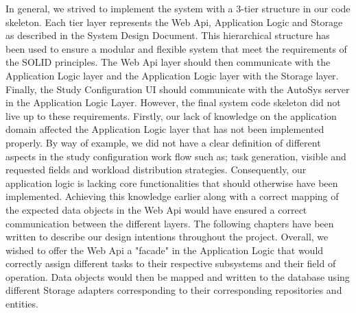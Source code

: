 In general, we strived to implement the system with a 3-tier structure in our code skeleton. Each tier layer represents the Web Api, Application Logic and Storage as described in the System Design Document. This hierarchical structure has been used to ensure a modular and flexible system that meet the requirements of the SOLID principles. The Web Api layer should then communicate with the Application Logic layer and the Application Logic layer with the Storage layer. Finally, the Study Configuration UI should communicate with the AutoSys server in the Application Logic Layer. However, the final system code skeleton did not live up to these requirements. Firstly, our lack of knowledge on the application domain affected the Application Logic layer that has not been implemented properly. By way of example, we did not have a clear definition of different aspects in the study configuration work flow such as; task generation, visible and requested fields and workload distribution strategies. Consequently, our application logic is lacking core functionalities that should otherwise have been implemented. Achieving this knowledge earlier along with a correct mapping of the expected data objects in the Web Api would have ensured a correct communication between the different layers. The following chapters have been written to describe our design intentions throughout the project. Overall, we wished to offer the Web Api a "facade" in the Application Logic that would correctly assign different tasks to their respective subsystems and their field of operation. Data objects would then be mapped and written to the database using different Storage adapters corresponding to their corresponding repositories and entities.